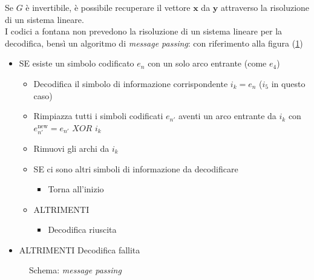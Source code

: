 \documentclass[italian, a4paper, 12pt]{article}
\begin{document}
Se $G$ è invertibile, è possibile recuperare il vettore $\bm{x}$ da $\bm{y}$ attraverso la risoluzione di un sistema lineare.\\
I codici a fontana non prevedono la risoluzione di un sistema lineare per la decodifica, bensì un algoritmo di \textit{message passing}: con riferimento alla figura (\ref{fig:FC})
\begin{itemize}
        \item SE esiste un simbolo codificato $e_n$ con un solo arco entrante (come $e_4$)\begin{itemize}
                \item	Decodifica il simbolo di informazione corrispondente $i_k=e_n$ ($i_5$ in questo caso)
                \item	Rimpiazza tutti i simboli codificati $e_{n'}$ aventi un arco entrante da $i_k$ con $e_{n'}^{\text{new}} = e_{n'} \textit{ XOR } i_k$
                \item   Rimuovi gli archi da $i_k$
                \item   SE ci sono altri simboli di informazione da decodificare \begin{itemize}
                        \item Torna all'inizio
                \end{itemize}
                \item ALTRIMENTI\begin{itemize}
                        \item Decodifica riuscita
                \end{itemize}
        \end{itemize}

        \item ALTRIMENTI Decodifica fallita
\end{itemize}
\begin{figure}[H]
    \centering
    \caption{Schema: \textit{message passing}}
    \label{fig:FC}
\end{figure}
\newpage
\end{document}
